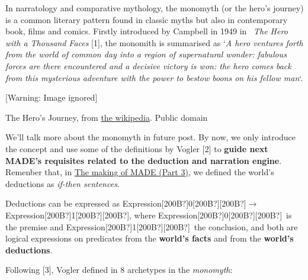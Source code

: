 \documentclass[a4paper]{article}
\newcommand\textstyleStrongEmphasis[1]{\textbf{#1}}
\newcommand\textstyleEmphasis[1]{\textit{#1}}
\begin{document}
In narratology and comparative mythology, the monomyth (or the
hero{\textquoteright}s journey) is a common literary pattern found in
classic myths but also in contemporary book, films and comics. Firstly
introduced by Campbell in 1949 in~ \textit{The Hero with a Thousand
Faces} [1], the monomith is summarised as
{\textquoteleft}\textstyleEmphasis{A hero ventures forth from the world
of common day into a region of supernatural wonder: fabulous forces are
there encountered and a decisive victory is won: the hero comes back
from this mysterious adventure with the power to bestow boons on his
fellow man}{\textquoteleft}.

  [Warning: Image ignored] %
 

The Hero{\textquoteright}s Journey, from
\href{https://en.wikipedia.org/wiki/File:Heroesjourney.svg}{the
wikipedia}. Public domain

We{\textquoteright}ll talk more about the monomyth in future post. By
now, we only introduce the concept and use some of the definitions by
Vogler [2] to \textstyleStrongEmphasis{guide next
MADE{\textquoteright}s requisites related to the deduction and
narration engine}. Remenber that, in
\href{http://www.velonuboso.com/made/2015/06/14/making-part-3-worlds-facts-worlds-deductions-worlds-backstories/}{The
making of MADE (Part 3)}, we defined the world{\textquoteright}s
deductions as \textstyleEmphasis{if-then sentences}.

Deductions can be expressed as
Expression[200B?]0[200B?][200B?]$\rightarrow
$Expression[200B?]1[200B?][200B?], where
Expression[200B?]0[200B?][200B?]~is the premise and
Expression[200B?]1[200B?][200B?]~the conclusion, and both are logical
expressions on predicates from the
\textstyleStrongEmphasis{world{\textquoteright}s facts} and from the
\textstyleStrongEmphasis{world{\textquoteright}s deductions}.

Following [3], Vogler defined in 8 archetypes in the
\textstyleEmphasis{monomyth}:
\end{document}

